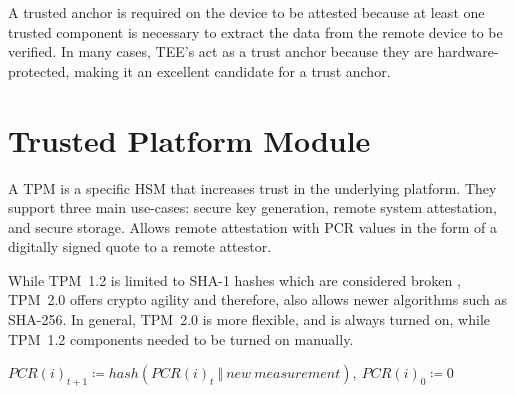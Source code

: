 A trusted anchor is required on the device to be attested because at least one trusted component is necessary to extract the data from the remote device to be verified. In many cases, TEE's act as a trust anchor because they are hardware-protected, making it an excellent candidate for a trust anchor.

\section{Trusted Platform Module}

A TPM is a specific \ac{HSM} that increases trust in the underlying platform.
They support three main use-cases: secure key generation, remote system attestation, and secure storage. 
Allows remote attestation with \ac{PCR} values in the form of a digitally signed quote to a remote attestor.



While TPM~1.2 is limited to SHA-1 hashes which are considered broken \cite{Stevens2017}, TPM~2.0 offers crypto agility and therefore, also allows newer algorithms such as SHA-256. In general, TPM~2.0 is more flexible, and is always turned on, while TPM~1.2 components needed to be turned on manually.


$PCR(i)_{t+1} \coloneqq hash(PCR(i)_t\ \Vert\ new\ measurement),\ PCR(i)_0 \coloneqq 0$

